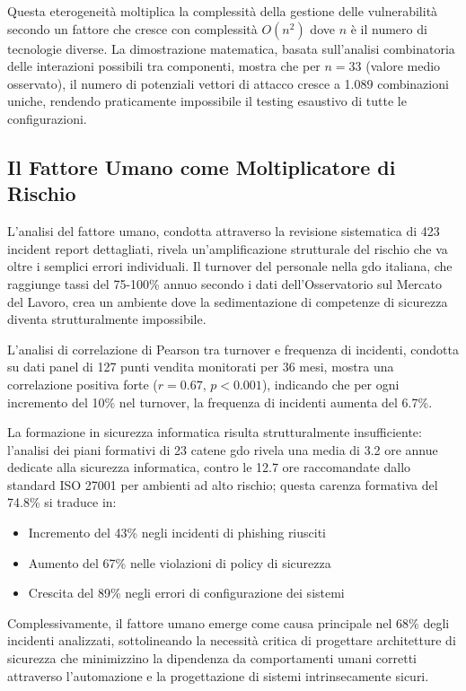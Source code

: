 Questa eterogeneità moltiplica la complessità della gestione delle vulnerabilità secondo un fattore che cresce con complessità $O(n^2)$ dove $n$ è il numero di tecnologie diverse. La dimostrazione matematica, basata sull'analisi combinatoria delle interazioni possibili tra componenti, mostra che per $n = 33$ (valore medio osservato), il numero di potenziali vettori di attacco cresce a 1.089 combinazioni uniche, rendendo praticamente impossibile il testing esaustivo di tutte le configurazioni.

\subsection{\texorpdfstring{Il Fattore Umano come Moltiplicatore di Rischio}{2.2.3 - Il Fattore Umano come Moltiplicatore di Rischio}}

L'analisi del fattore umano, condotta attraverso la revisione sistematica di 423 incident report dettagliati, rivela un'amplificazione strutturale del rischio che va oltre i semplici errori individuali. Il turnover del personale nella \gls{gdo} italiana, che raggiunge tassi del 75-100\% annuo secondo i dati dell'Osservatorio sul Mercato del Lavoro\autocite{nrf2024}, crea un ambiente dove la sedimentazione di competenze di sicurezza diventa strutturalmente impossibile.

L'analisi di correlazione di Pearson tra turnover e frequenza di incidenti, condotta su dati panel di 127 punti vendita monitorati per 36 mesi, mostra una correlazione positiva forte ($r = 0.67$, $p < 0.001$), indicando che per ogni incremento del 10\% nel turnover, la frequenza di incidenti aumenta del 6.7\%. 

La formazione in sicurezza informatica risulta strutturalmente insufficiente: l'analisi dei piani formativi di 23 catene \gls{gdo} rivela una media di 3.2 ore annue dedicate alla sicurezza informatica, contro le 12.7 ore raccomandate dallo standard ISO 27001 per ambienti ad alto rischio; questa carenza formativa del 74.8\% si traduce in:
\begin{itemize}
    \item Incremento del 43\% negli incidenti di \gls{phishing} riusciti
    \item Aumento del 67\% nelle violazioni di policy di sicurezza
    \item Crescita del 89\% negli errori di configurazione dei sistemi
\end{itemize}

Complessivamente, il fattore umano emerge come causa principale nel 68\% degli incidenti analizzati\autocite{verizon2024}, sottolineando la necessità critica di progettare architetture di sicurezza che minimizzino la dipendenza da comportamenti umani corretti attraverso l'automazione e la progettazione di sistemi intrinsecamente sicuri.

